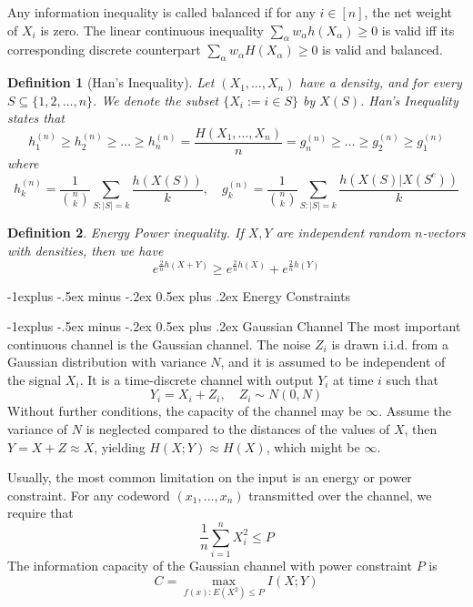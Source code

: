 \documentclass[10pt,landscape, a4paper]{article}
\makeatletter
\newtheorem{definition}{Definition}
\renewcommand{\subsection}{\@startsection{subsection}{2}{0mm}%
                                {-1explus -.5ex minus -.2ex}%
                                {0.5ex plus .2ex}%
                                {\normalfont\normalsize\bfseries}}
\makeatother
\begin{document}
\begin{multicols}{3}
  Any information inequality is called balanced if for any $i\in [n]$, the net weight of $X_i$ is zero. The linear continuous inequality $\sum_\alpha w_\alpha h(X_\alpha)\ge 0$ is valid iff its corresponding discrete counterpart $\sum_\alpha w_\alpha H(X_\alpha)\ge 0$ is valid and balanced.

  \begin{definition}[Han's Inequality]
    Let $(X_1,\dots, X_n)$ have a density, and for every $S\subseteq \{1,2,\dots,n\}$. We denote the subset $\{X_i:=i\in S\}$ by $X(S)$. Han's Inequality states that
    $$
    h_1^{(n)}\ge h_2^{(n)}\ge \dots \ge h_n^{(n)}=\frac{H(X_1,\dots, X_n)}{n}=g_n^{(n)}\ge \dots \ge g_2^{(n)}\ge g_1^{(n)}
    $$
    where
    $$
    h_k^{(n)}=\frac{1}{\binom{n}{k}}\sum_{S:|S|=k}\frac{h(X(S))}{k}, \quad g_k^{(n)}=\frac{1}{\binom{n}{k}}\sum_{S:|S|=k}\frac{h(X(S)|X(S^c))}{k}
  $$
  \end{definition}

  \begin{definition}
    Energy Power inequality. If $X,Y$ are independent random $n$-vectors with densities, then we have
    $$
    e^{\frac{2}{n}h(X+Y)}\ge e^{\frac{2}{n}h(X)}+e^{\frac{2}{n}h(Y)}
    $$
  \end{definition}

\subsection{Energy Constraints}

\subsection{Gaussian Channel}
The most important continuous channel is the Gaussian channel. The noise $Z_i$ is drawn i.i.d. from a  Gaussian distribution with variance $N$, and it is assumed to be independent of the signal $X_i$. It is a time-discrete channel with output $Y_i$ at time $i$ such that
$$
Y_i=X_i+Z_i, \quad Z_i\sim N(0,N)
$$
Without further conditions, the capacity of the channel may be $\infty$. Assume the variance of $N$ is neglected compared to the distances of the values of $X$, then $Y=X+Z\approx X$, yielding $H(X;Y)\approx H(X)$, which might be $\infty$.

Usually, the most common limitation on the input is an energy or power constraint. For any codeword $(x_1,\dots, x_n)$ transmitted over the channel, we require that
$$
\frac{1}{n}\sum_{i=1}^n X_i^2\le P
$$
The information capacity of the Gaussian channel with power constraint $P$ is
$$
C=\max_{f(x):E(X^2)\le P}I(X;Y)
$$


\end{multicols}
\end{document}
